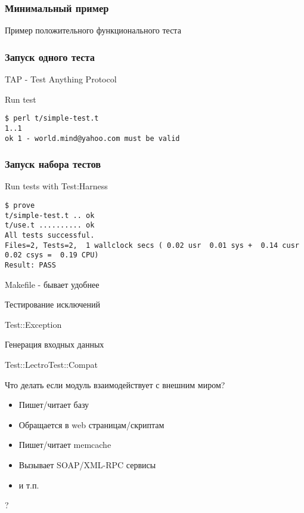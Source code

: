 \documentclass[aspectratio=169]{beamer}
\begin{document}
\begin{frame}[fragile]
\frametitle{Минимальный пример}
\begin{block}{Пример положительного функционального теста}

\end{block}
\end{frame}

\begin{frame}[fragile]
\frametitle{Запуск одного теста}
TAP - Test Anything Protocol
\begin{block}{Run test}
\begin{verbatim}
$ perl t/simple-test.t
1..1
ok 1 - world.mind@yahoo.com must be valid
\end{verbatim}
\end{block}
\end{frame}

\begin{frame}[fragile]
\frametitle{Запуск набора тестов}
\begin{block}{Run tests with Test:Harness}
\begin{verbatim}
$ prove
t/simple-test.t .. ok   
t/use.t .......... ok   
All tests successful.
Files=2, Tests=2,  1 wallclock secs ( 0.02 usr  0.01 sys +  0.14 cusr  0.02 csys =  0.19 CPU)
Result: PASS
\end{verbatim}
\end{block}
Makefile - бывает удобнее
\end{frame}

\begin{frame}{Тестирование исключений}
\begin{block}{Test::Exception}

\end{block}
\end{frame}

\begin{frame}{Генерация входных данных}
\begin{block}{Test::LectroTest::Compat}

\end{block}
\end{frame}

\begin{frame}{Что делать если модуль взаимодействует с внешним миром?}
\begin{itemize}
\item Пишет/читает базу
\item Обращается в web страницам/скриптам
\item Пишет/читает memcache
\item Вызывает SOAP/XML-RPC сервисы
\item и т.п.
\end{itemize}
\begin{center} 
\LARGE ?
\end{center}
\end{frame}
\end{document}
